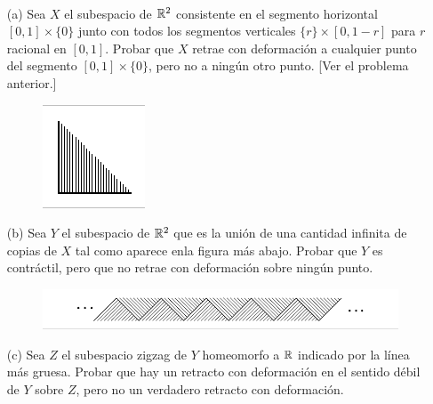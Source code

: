 \documentclass[twoside]{article}
\begin{document}
\begin{ejercicio}{0.6}\
\begin{enumerate}

\item[(a)] Sea $X$ el subespacio de $\mathbb{R}^2$ consistente en el segmento horizontal $[0,1]\times\{0\}$ junto con todos los segmentos verticales $\{r\}\times[0,1-r]$ para $r$ racional en $[0,1]$. Probar que $X$ retrae con deformación a cualquier punto del segmento $[0,1]\times\{0\}$, pero no a ningún otro punto. [Ver el problema anterior.]

\begin{figure}[h!]
\centering
\includegraphics[scale=0.7]{peine}
\end{figure}

\item[(b)] Sea $Y$ el subespacio de $\mathbb{R}^2$ que es la unión de una cantidad infinita de copias de $X$ tal como aparece enla figura más abajo. Probar que $Y$ es contráctil, pero que no retrae con deformación sobre ningún punto.
\begin{figure}[h!]
\centering
\includegraphics[scale=0.7]{peines}
\end{figure}

\item[(c)] Sea $Z$ el subespacio zigzag de $Y$ homeomorfo a $\mathbb{R}$ indicado por la línea más gruesa. Probar que hay un retracto con deformación en el sentido débil de $Y$ sobre $Z$, pero no un verdadero retracto con deformación. 
\end{enumerate}
\end{ejercicio}
\begin{solucion}

\end{solucion}

\newpage
\end{document}
